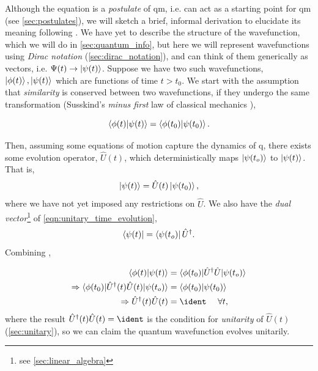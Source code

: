 Although the \schrodinger equation is a \emph{postulate} of \gls{qm}, 
    i.e. can act as a starting point for \gls{qm} (see \cref{sec:postulates}), 
    we will sketch a brief, informal derivation to elucidate its meaning
    following \cite{susskind2014quantum}.
We have yet to describe the structure of the wavefunction, which we will do in \cref{sec:quantum_info},
    but here we will represent wavefunctions using \emph{Dirac notation} (\cref{sec:dirac_notation}), 
    and can think of them generically as vectors, i.e. $\Psi(t) \rightarrow \ket{\psi(t)}$. 
Suppose we have two such wavefunctions, $\ket{\phi(t)}, \ket{\psi(t)}$ which are functions of time $t > t_0$.
We start with the assumption that \emph{similarity} is conserved between two wavefunctions,
    if they undergo the same transformation 
    (Susskind's \emph{minus first} law of classical mechanics \cite{susskind2014quantum}),

\begin{equation}
    \label{eqn:conservation_simularity}
    \braket{\phi(t) | \psi(t)} = \braket{\phi(t_0) | \psi(t_0)}.
\end{equation}

Then, assuming some equations of motion capture the dynamics of \gls{q}, 
    there exists some evolution operator, $\hat{U}(t)$, which deterministically maps $\ket{\psi(t_o)}$ to $\ket{\psi(t)}$.
That is, 
\begin{equation}
    \label{eqn:unitary_time_evolution}
    \ket{\psi(t)} = \hat{U}(t) \ket{\psi(t_0)},
\end{equation}
    where we have not yet imposed any restrictions on $\hat{U}$. 
We also have the \emph{dual vector}\footnote{see \cref{sec:linear_algebra}} of \cref{eqn:unitary_time_evolution},
\begin{equation}
    \label{eqn:dual_unitary_evolution}
    \bra{\psi(t)} = \bra{\psi(t_o)}\hat{U}^{\dagger}.
\end{equation} 
Combining , 

\begin{align}
    \begin{split}
        \braket{\phi(t) | \psi(t)} &= \braket{ \phi(t_0) | \hat{U}^{\dag} \hat{U}| \psi(t_o) }
        \\
        \Rightarrow \braket{ \phi(t_0) | \hat{U}^{\dag}(t) \hat{U}(t) | \psi(t_o) } &= \braket{\phi(t_0) | \psi(t_0)}
        \\
        \Rightarrow \hat{U}^{\dag}(t) \hat{U}(t) &= \ident \ \ \ \ \forall t,
    \end{split}
\end{align}
where the result $\hat{U}^{\dag}(t) \hat{U}(t) = \ident$ is the condition for \emph{unitarity} of $\hat{U}(t)$ (\cref{sec:unitary}), 
    so we can claim the quantum wavefunction evolves unitarily. 
\par 

